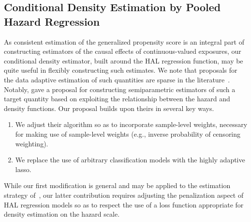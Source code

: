 \subsection{Conditional Density Estimation by Pooled Hazard Regression}

As consistent estimation of the generalized propensity score is an integral part
of constructing estimators of the causal effects of continuous-valued exposures,
our conditional density estimator, built around the HAL regression function, may
be quite useful in flexibly constructing such estimates. We note that proposals
for the data adaptive estimation of such quantities are sparse in the
literature~\citep[e.g.,][]{zhu2015boosting}. Notably, \citet{diaz2011super} gave
a proposal for constructing semiparametric estimators of such a target quantity
based on exploiting the relationship between the hazard and density functions.
Our proposal builds upon theirs in several key ways.

\begin{enumerate}
  \item We adjust their algorithm so as to incorporate sample-level weights,
     necessary for making use of sample-level weights (e.g., inverse probability
     of censoring weighting).
  \item We replace the use of arbitrary classification models with the highly
  adaptive lasso.
\end{enumerate}

While our first modification is general and may be applied to the estimation
strategy of~\citet{diaz2011super}, our latter contribution requires adjusting
the penalization aspect of HAL regression models so as to respect the use of
a loss function appropriate for density estimation on the hazard scale.

